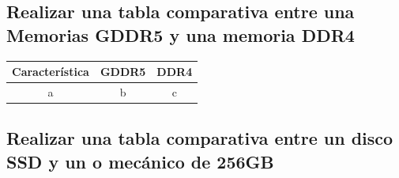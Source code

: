 \documentclass{article}
\begin{document}



\subsection*{Realizar una tabla comparativa entre una Memorias GDDR5 y una memoria DDR4}
\begin{center}
    \begin{tabular}{|c|c|c|}
        Característica & GDDR5 & DDR4 \\
        \hline
        a & b & c \\
    \end{tabular}
\end{center}

\subsection*{Realizar una tabla comparativa entre un disco SSD y un o mecánico de 256GB}
\end{document}
